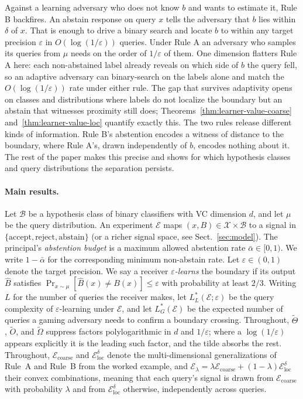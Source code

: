 \documentclass[runningheads,envcountsame]{llncs}
\newcommand{\cB}{\mathcal{B}}
\newcommand{\cX}{\mathcal{X}}
\newcommand{\cE}{\mathcal{E}}
\newcommand{\eps}{\varepsilon}
\begin{document}
Against a learning adversary who does not know $b$ and wants to estimate it, Rule B backfires. An abstain response on query $x$ tells the adversary that $b$ lies within $\delta$ of $x$. That is enough to drive a binary search and locate $b$ to within any target precision $\eps$ in $O(\log(1/\eps))$ queries. Under Rule A an adversary who samples its queries from $\mu$ needs on the order of $1/\eps$ of them. One dimension flatters Rule A here: each non-abstained label already reveals on which side of $b$ the query fell, so an adaptive adversary can binary-search on the labels alone and match the $O(\log(1/\eps))$ rate under either rule. The gap that survives adaptivity opens on classes and distributions where labels do not localize the boundary but an abstain that witnesses proximity still does; Theorems~\ref{thm:learner-value-coarse} and~\ref{thm:learner-value-loc} quantify exactly this.
The two rules release different kinds of information. Rule B's abstention encodes a witness of distance to the boundary, where Rule A's, drawn independently of $b$, encodes nothing about it. The rest of the paper makes this precise and shows for which hypothesis classes and query distributions the separation persists.

\paragraph{Main results.}
Let $\cB$ be a hypothesis class of binary classifiers with VC dimension $d$, and let $\mu$ be the query distribution. An experiment $\cE$ maps $(x, B) \in \cX \times \cB$ to a signal in $\{\text{accept}, \text{reject}, \text{abstain}\}$ (or a richer signal space, see Sect.~\ref{sec:model}). The principal's \emph{abstention budget} is a maximum allowed abstention rate $\bar\alpha \in [0,1)$. We write $1 - \bar\alpha$ for the corresponding minimum non-abstain rate. Let $\eps \in (0, 1)$ denote the target precision. We say a receiver \emph{$\eps$-learns} the boundary if its output $\hat B$ satisfies $\Pr_{x \sim \mu}[\hat B(x) \neq B(x)] \leq \eps$ with probability at least $2/3$. Writing $L$ for the number of queries the receiver makes, let $L^*_L(\cE; \eps)$ be the query complexity of $\eps$-learning under $\cE$, and let $L^*_G(\cE)$ be the expected number of queries a gaming adversary needs to confirm a boundary crossing. Throughout, $\tilde\Theta$, $\tilde O$, and $\tilde\Omega$ suppress factors polylogarithmic in $d$ and $1/\eps$; where a $\log(1/\eps)$ appears explicitly it is the leading such factor, and the tilde absorbs the rest. Throughout, $\cE_{\mathrm{coarse}}$ and $\cE_{\mathrm{loc}}^\delta$ denote the multi-dimensional generalizations of Rule~A and Rule~B from the worked example, and $\cE_\lambda = \lambda \cE_{\mathrm{coarse}} + (1-\lambda) \cE_{\mathrm{loc}}^\delta$ their convex combinations, meaning that each query's signal is drawn from $\cE_{\mathrm{coarse}}$ with probability $\lambda$ and from $\cE_{\mathrm{loc}}^\delta$ otherwise, independently across queries.
\end{document}
